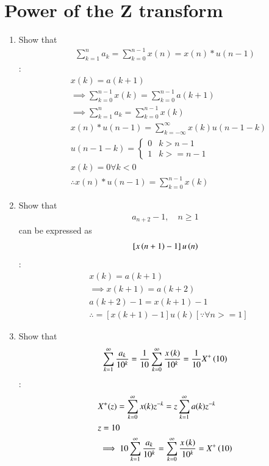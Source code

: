 \documentclass[journal,12pt,twocolumn]{IEEEtran}
\renewcommand\thesection{\arabic{section}}
\begin{document}
\section{Power of the Z transform}
\begin{enumerate}[label=\thesection.\arabic*,ref=\thesection.\theenumi]
\item Show that 
\begin{align}
	\sum_{k=1}^{n}a_k = 
	\sum_{k=0}^{n-1}x(n) = x(n)*u(n-1)
\end{align}
\solution:
\begin{align}
	& x(k)=a(k+1)\\
	&\implies \sum_{k=0}^{n-1} x(k)=\sum_{k=0}^{n-1} a(k+1)\\
	&\implies \sum_{k=1}^{n}a_{k} = \sum_{k=0}^{n-1}x(k)\\
	& x(n)*u(n-1)=\sum_{k=-\infty}^{\infty} x(k) u(n-1-k)\\
	&u(n-1-k)=\begin{cases}
		0 & k>n-1\\
		1 & k>=n-1
	\end{cases}\\
	&x(k)=0 \forall k<0\\
	&\therefore x(n)*u(n-1)=\sum_{k=0}^{n-1} x(k)
\end{align}
\item Show that 
\begin{align}
a_{n+2}-1, \quad n \ge 1
\end{align}
can be expressed as 
\begin{align}
	{}\left[x\left(n+1\right)-1\right]u\left(n\right)
\end{align}
\solution:
\begin{align}
	&x(k)=a(k+1)\\
	&\implies x(k+1)=a(k+2)\\
	&a(k+2)-1=x(k+1)-1\\
	&\therefore =[x(k+1)-1]u(k)[\because \forall n>=1]
\end{align}
 \item Show that 
\begin{align}
	\sum_{k=1}^{\infty}\frac{a_k}{10^k}= 
	\frac{1}{10}\sum_{k=0}^{\infty}\frac{x\left(k\right)}{10^k} =\frac{1}{10}X^{+}\left({10}\right)
\end{align}
\solution:
\begin{align}
	&X^{+}(z)=\sum_{k=0}^{\infty} x(k)z^{-k}=z\sum_{k=1}^{\infty} a(k) z^{-k}\\
	&z=10\\
	&\implies 10\sum_{k=1}^{\infty}\frac{a_k}{10^k}=\sum_{k=0}^{\infty}\frac{x\brak{k}}{10^k} =X^{+}\brak{{10}}\\

\end{align}
\end{enumerate}
\end{document}
